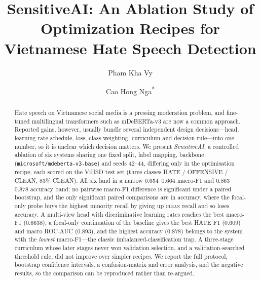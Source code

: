 \documentclass[a4paper,runningheads]{llncs}
\begin{document}
\title{SensitiveAI: An Ablation Study of Optimization Recipes
       for Vietnamese Hate Speech Detection}

\author{
Pham Kha Vy \and
Cao Hong Nga\textsuperscript{*}
}




\maketitle

\begin{abstract}
Hate speech on Vietnamese social media is a pressing moderation problem, and
fine-tuned multilingual transformers such as mDeBERTa-v3 are now a common
approach.  Reported gains, however, usually bundle several independent design
decisions---head, learning-rate schedule, loss, class weighting, curriculum and
decision rule---into one number, so it is unclear which decision matters.  We
present \emph{SensitiveAI}, a controlled ablation of six systems sharing one fixed
split, label mapping, backbone (\texttt{microsoft/mdeberta-v3-base}) and seeds
42--44, differing only in the optimisation recipe, each scored on the ViHSD test set
(three classes HATE / OFFENSIVE / CLEAN, 83\% CLEAN).  All six land in a narrow
0.654--0.664 macro-F1 and 0.863--0.878 accuracy band; no pairwise macro-F1
difference is significant under a paired bootstrap, and the only significant paired
comparisons are in accuracy, where the focal-only probe buys the highest minority
recall by giving up \textsc{clean} recall and so loses accuracy.  A
multi-view head with discriminative learning rates reaches the best macro-F1
(0.6638), a focal-only continuation of the baseline gives the best HATE F1 (0.609)
and macro ROC-AUC (0.893), and the highest accuracy (0.878) belongs to the system
with the \emph{lowest} macro-F1---the classic imbalanced-classification trap.  A
three-stage curriculum whose later stages never won validation selection, and a
validation-searched threshold rule, did not improve over simpler recipes.  We
report the full protocol, bootstrap confidence intervals,
a confusion-matrix and error analysis, and the negative results, so the comparison
can be reproduced rather than re-argued.
\end{abstract}













{\let\small\scriptsize}
\end{document}
